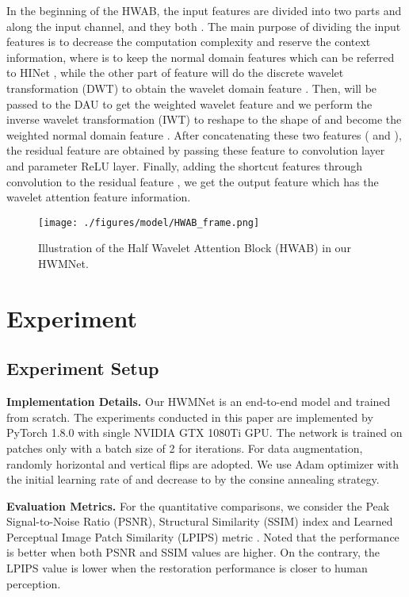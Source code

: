 \documentclass{article}
\begin{document}
In the beginning of the HWAB, the input features  are divided into two parts  and  along the input channel, and they both . The main purpose of dividing the input features is to decrease the computation complexity and reserve the context information, where  is to keep the normal domain features which can be referred to HINet \cite{hinet}, while the other part of feature  will do the discrete wavelet transformation (DWT) to obtain the wavelet domain feature . Then,  will be passed to the DAU \cite{01, cycleisp} to get the weighted wavelet feature  and we perform the inverse wavelet transformation (IWT) to reshape  to the shape of  and become the weighted normal domain feature . After concatenating these two features ( and ), the residual feature  are obtained by passing these feature to  convolution layer and parameter ReLU layer. Finally, adding the shortcut features through  convolution to the residual feature , we get the output feature  which has the wavelet attention feature information.

\begin{figure}[!htbp] 
\centering
	\texttt{[image: ./figures/model/HWAB\_frame.png]}
\centering
\caption{Illustration of the Half Wavelet Attention Block (HWAB) in our HWMNet.}
\label{HWAB}
\end{figure}





\section{Experiment}
\subsection{Experiment Setup}
\noindent\textbf{Implementation Details.} Our HWMNet is an end-to-end model and trained from scratch. The experiments conducted in this paper are implemented by PyTorch 1.8.0 with single NVIDIA GTX 1080Ti GPU. The network is trained on  patches only with a batch size of 2 for  iterations. For data augmentation, randomly horizontal and vertical flips are adopted. We use Adam optimizer with the initial learning rate of  and decrease to  by the consine annealing strategy. 


\noindent\textbf{Evaluation Metrics.} For the quantitative comparisons, we consider the Peak Signal-to-Noise Ratio (PSNR), Structural Similarity (SSIM) index and Learned Perceptual Image Patch Similarity (LPIPS) metric \cite{LPIPS}. Noted that the performance is better when both PSNR and SSIM values are higher. On the contrary, the LPIPS value is lower when the restoration performance is closer to human perception.
\end{document}
